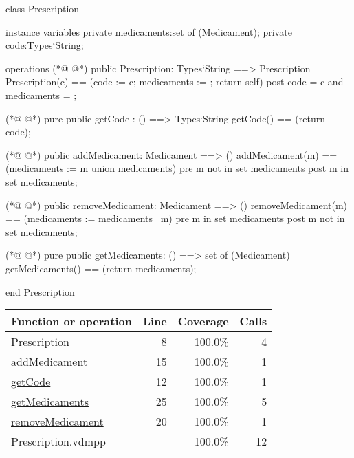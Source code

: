 \begin{vdmpp}[breaklines=true]
class Prescription

instance variables
  private medicaments:set of (Medicament);
  private code:Types`String;
  
operations
(*@
\label{Prescription:8}
@*)
 public Prescription: Types`String ==> Prescription
  Prescription(c) == (code := c; medicaments := {}; return self)
 post code = c and medicaments = {};
 
(*@
\label{getCode:12}
@*)
 pure public getCode : () ==> Types`String
  getCode() == (return code);
  
(*@
\label{addMedicament:15}
@*)
 public addMedicament: Medicament ==> ()
  addMedicament(m) == (medicaments := {m} union medicaments)
 pre m not in set medicaments
 post m in set medicaments;
  
(*@
\label{removeMedicament:20}
@*)
 public removeMedicament: Medicament ==> ()
  removeMedicament(m) == (medicaments := medicaments \ {m})
 pre m in set medicaments
 post m not in set medicaments;
  
(*@
\label{getMedicaments:25}
@*)
 pure public getMedicaments: () ==> set of (Medicament)
  getMedicaments() == (return medicaments);

end Prescription
\end{vdmpp}
\bigskip
\begin{longtable}{|l|r|r|r|}
\hline
Function or operation & Line & Coverage & Calls \\
\hline
\hline
\hyperref[Prescription:8]{Prescription} & 8&100.0\% & 4 \\
\hline
\hyperref[addMedicament:15]{addMedicament} & 15&100.0\% & 1 \\
\hline
\hyperref[getCode:12]{getCode} & 12&100.0\% & 1 \\
\hline
\hyperref[getMedicaments:25]{getMedicaments} & 25&100.0\% & 5 \\
\hline
\hyperref[removeMedicament:20]{removeMedicament} & 20&100.0\% & 1 \\
\hline
\hline
Prescription.vdmpp & & 100.0\% & 12 \\
\hline
\end{longtable}


